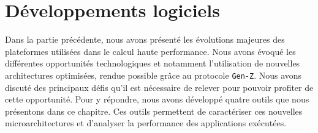 \chapter{Développements logiciels} \label{chap:dev}

Dans la partie précédente, nous avons présenté les  évolutions majeures des plateformes utilisées dans le calcul haute performance. Nous avons évoqué les différentes opportunités technologiques et notamment l'utilisation de nouvelles architectures optimisées, rendue possible grâce au protocole \verb=Gen-Z=. Nous avons discuté des principaux défis qu'il est nécessaire de relever pour pouvoir profiter de cette opportunité. Pour y répondre, nous avons développé quatre outils que nous présentons dans ce chapitre. Ces outils permettent de caractériser ces nouvelles microarchitectures et d'analyser la performance des applications exécutées.

\minitoc
\glsresetall

    \iflong
        \newpage
        \newpage
        \newpage
        \newpage
        \newpage
        
    \else
    \fi 
   
